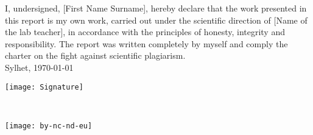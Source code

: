 \iftrue %
    I, undersigned, [First Name Surname], %
    hereby declare that the work presented in this report is my own work, carried out under the scientific direction of [Name of the lab teacher], %
    in accordance with the principles of honesty, integrity and responsibility. The report was written completely by myself and comply the charter on the fight against scientific plagiarism.\\
    
    Sylhet, \today
    
    \begin{flushright}\texttt{[image: Signature]}\end{flushright}%
\fi

\iffalse %
     I, undersigned, [First Name Surname], %
    hereby declare that the work presented in this report is my own work, carried out under the scientific direction of [Name of the lab teacher], %
    in accordance with the principles of honesty, integrity and responsibility. The report was written completely by myself and comply the charter on the fight against scientific plagiarism.\\
    
    Sylhet, \today
    
    \begin{flushright}\texttt{[image: Signature]}\end{flushright}%
\fi

~\vfill
\begin{center}
	\begin{minipage}[c]{0.25\linewidth}
		\texttt{[image: by-nc-nd-eu]}
	\end{minipage}\hfill
\end{center}


\newpage
